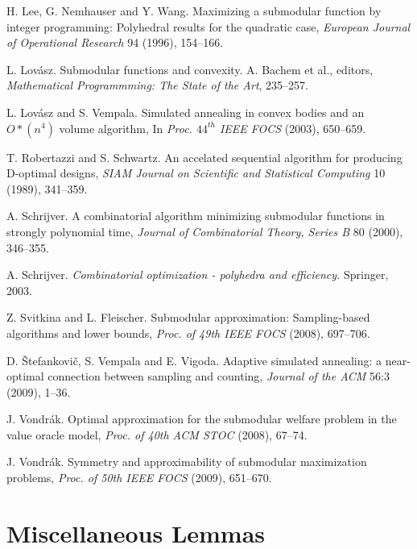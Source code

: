 \documentclass{article}[11pt]
\begin{document}
\begin{thebibliography}{99}
 H. Lee, G. Nemhauser and Y. Wang.
Maximizing a submodular function by integer programming:
Polyhedral results for the quadratic case,
{\em European Journal of Operational Research} 94 (1996), 154--166.

 L. Lov\'asz.
Submodular functions and convexity.
A. Bachem et al., editors, {\em Mathematical Programmming: The State of the Art}, 235--257.

 L. Lov\'asz and S. Vempala.
Simulated annealing in convex bodies and an $O*(n^4)$ volume algorithm,
In {\em Proc. $44^{th}$ IEEE FOCS} (2003), 650--659.

 T. Robertazzi and S. Schwartz.
An accelated sequential algorithm for producing D-optimal designs,
{\em SIAM Journal on Scientific and Statistical Computing} 10 (1989), 341--359.

 A. Schrijver.
A combinatorial algorithm minimizing submodular functions in strongly polynomial time,
{\em Journal of Combinatorial Theory, Series B} 80 (2000), 346--355.

 A. Schrijver.
{\em Combinatorial optimization - polyhedra and efficiency.}
Springer, 2003.

Z. Svitkina and L. Fleischer.
Submodular approximation: Sampling-based algorithms and lower bounds,
\emph{Proc. of 49th IEEE FOCS} (2008), 697--706.

 D. \v{S}tefankovi\v{c}, S. Vempala and E. Vigoda.
Adaptive simulated annealing: a near-optimal connection between sampling and counting,
{\em Journal of the ACM} 56:3 (2009), 1--36. 

 J. Vondr\'ak.
Optimal approximation for the submodular welfare problem in the value oracle model,
{\em Proc. of 40th ACM STOC} (2008), 67--74.

 J. Vondr\'ak.
Symmetry and approximability of submodular maximization problems,
{\em Proc. of 50th IEEE FOCS} (2009), 651--670.


\end{thebibliography}






\appendix

\section{Miscellaneous Lemmas}
\label{app:misc}
\end{document}
